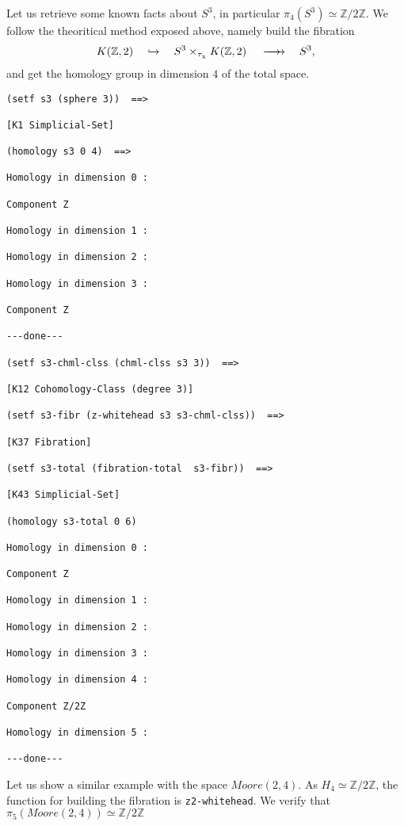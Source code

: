 Let us retrieve some known facts about $S^3$, in particular $\pi_4(S^3) \simeq \mathbb{Z}/{2 \mathbb{Z}}$.
We follow the theoritical method exposed above, namely  build the fibration
$$  K(\mathbb{Z},2) \quad \hookrightarrow\quad  S^3 \times_{\tau_\chi} K(\mathbb{Z},2) \hskip 1.2em
    \longrightarrow \hskip -1.2em \longrightarrow     \quad S^3,$$
and get the homology group in dimension $4$ of the total space.
{\footnotesize\begin{verbatim}
(setf s3 (sphere 3))  ==>

[K1 Simplicial-Set]

(homology s3 0 4)  ==>

Homology in dimension 0 :

Component Z

Homology in dimension 1 :

Homology in dimension 2 :

Homology in dimension 3 :

Component Z

---done---

(setf s3-chml-clss (chml-clss s3 3))  ==>

[K12 Cohomology-Class (degree 3)]

(setf s3-fibr (z-whitehead s3 s3-chml-clss))  ==>

[K37 Fibration]

(setf s3-total (fibration-total  s3-fibr))  ==>

[K43 Simplicial-Set]

(homology s3-total 0 6)

Homology in dimension 0 :

Component Z

Homology in dimension 1 :

Homology in dimension 2 :

Homology in dimension 3 :

Homology in dimension 4 :

Component Z/2Z

Homology in dimension 5 :

---done---
\end{verbatim}}
Let us show a similar example with the space $Moore(2,4)$. As $H_4 \simeq \mathbb{Z}/{2 \mathbb{Z}}$, the function
for building the fibration is {\tt z2-whitehead}.
We verify that $\pi_5(Moore(2,4))\simeq \mathbb{Z}/{2 \mathbb{Z}}$
